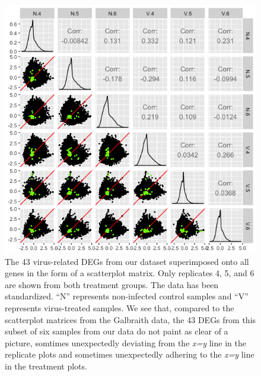 \documentclass[11pt,a4paper,oldfontcommands,openany]{memoir}
\numberwithin{equation}{section} %
\begin{document}
\begin{figure}[H]
  \includegraphics[width=\textwidth]{Images/RutterSM2}
  \caption{The 43 virus-related DEGs from our dataset superimposed onto all genes in the form of a scatterplot matrix. Only replicates 4, 5, and 6 are shown from both treatment groups. The data has been standardized. ``N'' represents non-infected control samples and ``V'' represents virus-treated samples. We see that, compared to the scatterplot matrices from the Galbraith data, the 43 DEGs from this subset of six samples from our data do not paint as clear of a picture, somtimes unexpectedly deviating from the \textit{x=y} line in the replicate plots and sometimes unexpectedly adhering to the \textit{x=y} line in the treatment plots.}
  \label{fig:RutterSM2}
\end{figure}
\end{document}
